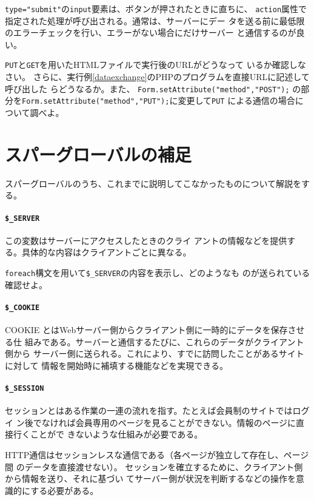 \Verb+type="submit"+の\texttt{input}要素は、ボタンが押されたときに直ちに、
\texttt{action}属性で指定された処理が呼び出される。通常は、サーバーにデー
タを送る前に最低限のエラーチェックを行い、エラーがない場合にだけサーバー
と通信するのが良い。
\begin{Prob}\upshape
 \texttt{PUT}と\texttt{GET}を用いたHTMLファイルで実行後のURLがどうなって
 いるか確認しなさい。
 さらに、実行例\ref{dataexchange}のPHPのプログラムを直接URLに記述して呼び出した
 らどうなるか。また、
   \Verb+Form.setAttribute("method","POST");+
 の部分を\Verb+Form.setAttribute("method","PUT");+に変更して\texttt{PUT}
 による通信の場合について調べよ。
\end{Prob}
\section{スパーグローバルの補足}
スパーグローバルのうち、これまでに説明してこなかったものについて解説をす
る。
\paragraph{\texttt{\$\_SERVER}}
この変数はサーバーにアクセスしたときのクライ
アントの情報などを提供する。具体的な内容はクライアントごとに異なる。
\begin{Prob}\upshape
 \texttt{foreach}構文を用いて\Verb+$_SERVER+の内容を表示し、どのようなも
 のが送られている確認せよ。
\end{Prob}
\paragraph{\texttt{\$\_COOKIE}}
COOKIE とはWebサーバー側からクライアント側に一時的にデータを保存させる仕
組みである。サーバーと通信するたびに、これらのデータがクライアント側から
サーバー側に送られる。これにより、すでに訪問したことがあるサイトに対して
情報を開始時に補填する機能などを実現できる。
\paragraph{\texttt{\$\_SESSION}}
セッションとはある作業の一連の流れを指す。たとえば会員制のサイトではログイ
ン後でなければ会員専用のページを見ることができない。情報のページに直接行くことがで
きないような仕組みが必要である。

HTTP通信はセッションレスな通信である（各ページが独立して存在し、ページ間
のデータを直接渡せない）。
セッションを確立するために、クライアント側から情報を送り、それに基づい
てサーバー側が状況を判断するなどの操作を意識的にする必要がある。

